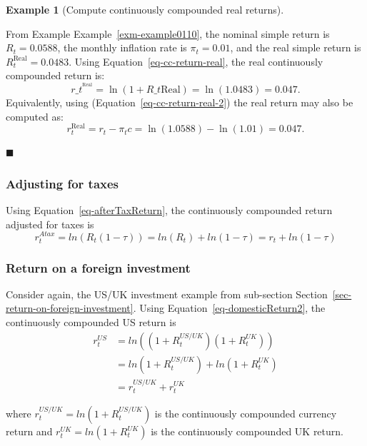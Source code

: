\documentclass[
  letterpaper,
  DIV=11,
  numbers=noendperiod]{scrreprt}
\theoremstyle{definition}
\theoremstyle{definition}
\newtheorem{example}{Example}[chapter]
\theoremstyle{remark}
\begin{document}
\begin{example}[Compute continuously compounded real
returns]\protect\hypertarget{exm-example0119}{}\label{exm-example0119}

From Example Example~\ref{exm-example0110}, the nominal simple return is
\(R_{t}=0.0588\), the monthly inflation rate is \(\pi_{t}=0.01\), and
the real simple return is \(R_{t}^{\textrm{Real}}=0.0483.\) Using
Equation~\ref{eq-cc-return-real}, the real continuously compounded
return is: \[
r\_{t}^{^\textrm{Real}}=\ln(1+R\_{t}{\textrm{Real}})=\ln(1.0483)=0.047.
\] Equivalently, using (Equation~\ref{eq-cc-return-real-2}) the real
return may also be computed as: \[
r_{t}^{\textrm{Real}}=r_{t}-\pi_{t}{c}=\ln(1.0588)-\ln(1.01)=0.047.
\]

\hfill{}\(\blacksquare\)

\end{example}

\hypertarget{adjusting-for-taxes-1}{%
\subsubsection{Adjusting for taxes}\label{adjusting-for-taxes-1}}

Using Equation~\ref{eq-afterTaxReturn}, the continuously compounded
return adjusted for taxes is \begin{equation}
r_{t}^{Atax} = ln \left(R_{t}(1-\tau) \right) = ln(R_{t}) + ln(1-\tau) = r_{t} + ln(1-\tau)
\end{equation}

\hypertarget{return-on-a-foreign-investment}{%
\subsubsection{Return on a foreign
investment}\label{return-on-a-foreign-investment}}

Consider again, the US/UK investment example from sub-section
Section~\ref{sec-return-on-foreign-investment}. Using
Equation~\ref{eq-domesticReturn2}, the continuously compounded US return
is \begin{align}
r_{t}^{US} &= ln \left( (1+R_{t}^{US/UK})(1+R_{t}^{UK}) \right) \nonumber \\
&= ln(1+R_{t}^{US/UK}) + ln(1+R_{t}^{UK}) \nonumber \\
&= r_{t}^{US/UK} + r_{t}^{UK}
\end{align}

where \(r_{t}^{US/UK} = ln(1+R_{t}^{US/UK})\) is the continuously
compounded currency return and \(r_{t}^{UK} = ln(1+R_{t}^{UK})\) is the
continuously compounded UK return.
\end{document}
